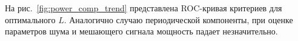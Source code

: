 \documentclass[specialist,
substylefile = spbu_report.rtx,
subf,href,colorlinks=true, 12pt]{disser}
\theoremstyle{definition}
\begin{document}
На рис.~\ref{fig:power_comp_trend} представлена ROC-кривая критериев для оптимального $L$. Аналогично случаю периодической компоненты, при оценке параметров шума и мешающего сигнала мощность падает незначительно.  
%
%
\end{document}
